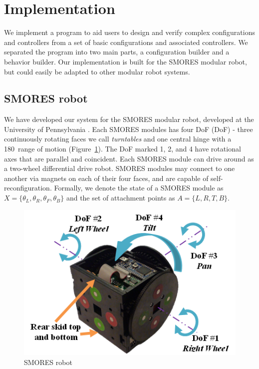 \documentclass[conference]{IEEEtran}
\theoremstyle{definition}
\begin{document}
\section{Implementation }
\label{sec:example}
We implement a program to aid users to design and verify complex configurations and controllers from a set of basic configurations and associated controllers. We separated the program into two main parts, a configuration builder and a behavior builder.
Our implementation is built for the SMORES modular robot, but could easily be adapted
to other modular robot systems. \subsection{SMORES robot}
We have developed our system for the SMORES modular robot, developed at the
University of Pennsylvania \cite{Davey2012}. Each SMORES modules has four DoF
(DoF) - three continuously rotating faces we call {\em turntables} and one
central hinge with a 180\textdegree\ range of motion (Figure~\ref{fig:SmoresRobot}). The
DoF marked 1, 2, and 4 have rotational axes that are parallel and coincident.
Each SMORES module can drive around as a two-wheel differential
drive robot.
SMORES modules may connect to one another via magnets on each of their four
faces, and are capable of  self-reconfiguration.
Formally, we denote the state of a SMORES module as \(X=\lbrace \theta_L, \theta_R,
\theta_F, \theta_B \rbrace\) and the set of attachment points as \(A=\lbrace L,R,T,B \rbrace\).




\begin{figure}[tb]
    \begin{center}
        \includegraphics[width=\columnwidth]{images/smores_robot.png}
    \end{center}
    \caption{SMORES robot}
    \label{fig:SmoresRobot}
\end{figure}
\end{document}
